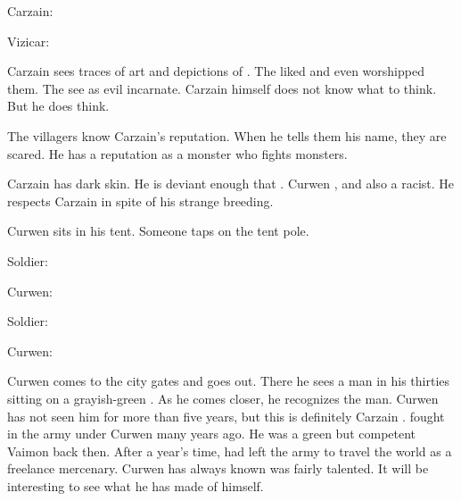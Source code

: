 \begin{prose}
  Carzain: 
  
  Vizicar:
\end{prose}

Carzain sees traces of \Ortaican art and depictions of \dragons.
The \Ortaicans liked \dragons and even worshipped them.
The \Iquinians see \dragons as evil incarnate.
Carzain himself does not know what to think.
But he does think.

The villagers know Carzain's reputation.
When he tells them his name, they are scared. 
He has a reputation as a monster who fights monsters. 









\begin{comment}
  \subsection{Carzain meets Curwen}
\end{comment}
\new
Carzain has dark skin.
He is deviant enough that .
Curwen , and also a racist. 
He respects Carzain in spite of his strange breeding. 


Curwen sits in his tent. 
Someone taps on the tent pole.

Soldier: 

Curwen:

Soldier:

Curwen:

Curwen comes to the city gates and goes out. 
There he sees a \human man in his thirties sitting on a grayish-green \relc. 
As he comes closer, he recognizes the man. 
Curwen has not seen him for more than five years, but this is definitely Carzain \Shireyo. 
\Shireyo fought in the army under Curwen many years ago. 
He was a green but competent Vaimon back then.
After a year's time, \Shireyo had left the army to travel the world as a freelance mercenary.
Curwen has always known \Shireyo was fairly talented. 
It will be interesting to see what he has made of himself. 


